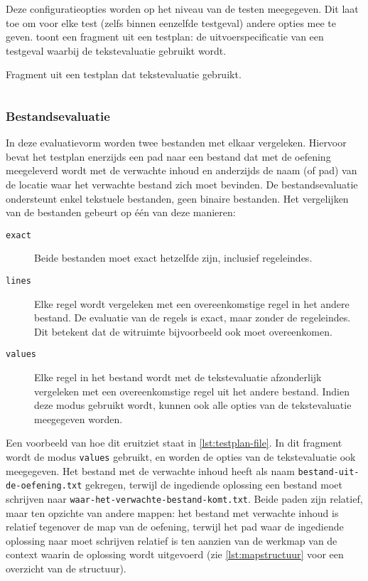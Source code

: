 Deze configuratieopties worden op het niveau van de testen meegegeven.
Dit laat toe om voor elke test (zelfs binnen eenzelfde testgeval) andere opties mee te geven.
 toont een fragment uit een testplan: de uitvoerspecificatie van een testgeval waarbij de tekstevaluatie gebruikt wordt.

\begin{listing}
    \caption{Fragment uit een testplan dat tekstevaluatie gebruikt.}
    \label{lst:testplan-text}
    \inputminted[breaklines]{json}{code/testplan-text.json}
\end{listing}

\subsubsection{Bestandsevaluatie}

In deze evaluatievorm worden twee bestanden met elkaar vergeleken.
Hiervoor bevat het testplan enerzijds een pad naar een bestand dat met de oefening meegeleverd wordt met de verwachte inhoud en anderzijds de naam (of pad) van de locatie waar het verwachte bestand zich moet bevinden.
De bestandsevaluatie ondersteunt enkel tekstuele bestanden, geen binaire bestanden.
Het vergelijken van de bestanden gebeurt op één van deze manieren:

\begin{description}
    \item[\texttt{exact}] Beide bestanden moet exact hetzelfde zijn, inclusief regeleindes.
    \item[\texttt{lines}] Elke regel wordt vergeleken met een overeenkomstige regel in het andere bestand.
    De evaluatie van de regels is exact, maar zonder de regeleindes.
    Dit betekent dat de witruimte bijvoorbeeld ook moet overeenkomen.
    \item[\texttt{values}] Elke regel in het bestand wordt met de tekstevaluatie afzonderlijk vergeleken met een overeenkomstige regel uit het andere bestand.
    Indien deze modus gebruikt wordt, kunnen ook alle opties van de tekstevaluatie meegegeven worden.
\end{description}

Een voorbeeld van hoe dit eruitziet staat in \cref{lst:testplan-file}.
In dit fragment wordt de modus \texttt{values} gebruikt, en worden de opties van de tekstevaluatie ook meegegeven.
Het bestand met de verwachte inhoud heeft als naam \texttt{bestand-uit-de-oefening.txt} gekregen, terwijl de ingediende oplossing een bestand moet schrijven naar \texttt{waar-het-verwachte-bestand-komt.txt}.
Beide paden zijn relatief, maar ten opzichte van andere mappen: het bestand met verwachte inhoud is relatief tegenover de map van de oefening, terwijl het pad waar de ingediende oplossing naar moet schrijven relatief is ten aanzien van de werkmap van de context waarin de oplossing wordt uitgevoerd (zie \cref{lst:mapstructuur} voor een overzicht van de structuur).

